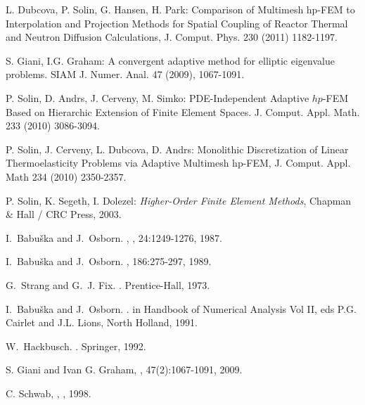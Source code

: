 \documentclass[preprint ,12pt]{elsarticle}
\begin{document}
\begin{thebibliography}{[KLR73]}

L. Dubcova, P. Solin, G. Hansen, H. Park: Comparison of Multimesh hp-FEM 
to Interpolation and Projection Methods for Spatial Coupling of Reactor 
Thermal and Neutron Diffusion Calculations, J. Comput. Phys. 230 (2011) 1182-1197.

S. Giani, I.G. Graham: A convergent adaptive method for elliptic eigenvalue 
problems. SIAM J. Numer. Anal. 47 (2009), 1067-1091.

P. Solin, D. Andrs, J. Cerveny, M. Simko: 
PDE-Independent Adaptive $hp$-FEM Based on Hierarchic Extension of Finite Element Spaces.
J. Comput. Appl. Math. 233 (2010) 3086-3094.

P. Solin, J. Cerveny, L. Dubcova, D. Andrs: Monolithic Discretization of Linear 
Thermoelasticity Problems via Adaptive Multimesh hp-FEM, J. Comput. Appl. Math 
234 (2010) 2350-2357.

P. Solin, K. Segeth, I. Dolezel: {\em Higher-Order Finite Element Methods},
Chapman \& Hall / CRC Press, 2003.

I.~Babu\v{s}ka and J.~Osborn.
, 
, 24:1249-1276, 1987.

I.~Babu\v{s}ka and J.~Osborn.
, 
 186:275-297, 1989.
 
G.~Strang and G.~J. Fix.
.
\newblock Prentice-Hall, 1973.

I.~Babu\v{s}ka and J.~Osborn.
.
\newblock in Handbook of Numerical Analysis Vol II, eds P.G. Cairlet and J.L. Lions, North Holland, 1991.

W.~Hackbusch.
.
\newblock Springer, 1992.

S. Giani and Ivan G. Graham,
,
 47(2):1067-1091, 2009.

C. Schwab,
,
, 1998.


\end{thebibliography}
\end{document}
